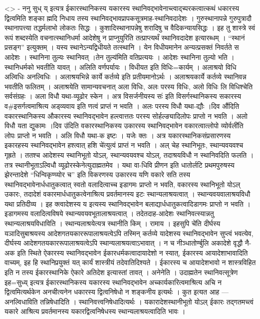 \textless{}\textgreater{} - ननु सुध् य् इत्यत्र ईकारस्थानिकस्य यकारस्य
स्थानिवद्भावेनाच्त्वाद्च्परकत्वात्कथं धकारस्य द्वित्वमिति शङ्का ह्मदि
निधाय तस्य स्थानिवद्भावप्रापकसूत्रमाह-स्थानिवदादेशः । गुरुस्थानापन्ने
गुरुपुत्रादौ स्थानापत्त्या तद्धर्मलाभो लोकतः सिद्धः ।
कुशादिस्थानापन्नेषु शरादिषु च वैदिकन्यायसिद्धः । इह तु शास्त्रे स्वं
रूपं शब्दस्येति वचनात्स्थानिधर्मा आदेशेषु न प्राप्नुयुरिति
तत्प्राप्त्यर्थं स्थानिवदादेश इत्यारब्धम् । ``स्थानं प्रसङ्ग''
इत्युक्तम् । यस्य स्थानेऽन्यद्विधीयते तत्स्थानि । येन विधीयमानेन
अन्यत्प्रसक्तं निवर्तते स आदेशः । स्थानिना तुल्यः स्थानिवत् ।तेन
तुल्य॑मिति वतिप्रत्ययः । आदेशः स्थानिना तुल्यो भति । स्थानिधर्मको भवतीति
यावत् । अलिति वर्णपर्यायः । विधीयत इति विधिः=कार्यम् । अलाश्रयो विधि
अल्विधिः अनल्विधिः । अलाश्रयभिन्ने कार्ये कर्तव्ये इति प्रतीयमानोऽर्थः ।
अलाश्रयकार्ये कर्तव्ये स्थानिवन्न भवतीति फलितम् । अलाश्रयेति
सामान्यवचनात् अला विधिः, अलः परस्य विधिः, अलो विधिः लि विधिश्चेति
सर्वसंग्रहः । अला विधौ यथा-व्यूढोर स्केन । अत्र विसर्जनीयस्य सः॑ इति
विसर्गस्थानिकस्य सकारस्य व\#इसर्गत्वमाश्रित्य अड्व्यवाय इति णत्वं
प्राप्तं न भवति । अलः परस्य विधौ यथा-द्यौः ।दिव औ॑दिति वकारस्थानिकस्य
औकारस्य स्थानिवद्भावेन हल्त्वात्ततः परस्य सोर्हल्ङ्यादिलोपः प्राप्तो न
भवति । अलो विधौ यता द्युकामः ।दिव उ॑दिति वकारस्थानिकस्य उकारस्य
स्थानिवद्भावेन वकारत्वात्लोपो व्योर्वली॑ति लोपः प्राप्तो न भवति । अलि
विधौ यथा-क इष्टः । यजेः क्तः । अत्र यकारस्थानिकसंप्रसारणस्य इकारहस्य
स्थानिवद्भावेन हश्त्वात् हशि चे॑त्युत्वं प्राप्तं न भवति । अल् चेह
स्थानिभूतः, स्थान्यवयवश्च गृह्रते । ततश्च आदेशस्य स्थानिभूतो योऽल्,
स्थान्यवयवश्च योऽल्, तदाश्रयविधौ न स्थानिवदिति फलति । तत्र
स्थानीभूताऽल्विधौ व्यूढोरस्केनेत्युदाह्मतमेव । यथा वा-धिवि प्रीणन इति
धातोर्लटि प्रथमपुरुषस्य झेरन्तादेशे ``धिन्विकृण्व्योर च'' इति विकरणस्य
उकारस्य यणि वकारे सति तस्य स्थानिवद्भावेनार्धधातुकत्वात् स्वतो
वलादित्वाच्च इडागमः प्राप्तो न भवति, वकारस्य स्थानिभूतो योऽल् उकारः,
तदादेशं वकारमार्धधातुकत्वेनाश्रित्य प्रवर्तमानस्य इटः
स्थान्यलाश्रयत्वात् । स्थान्यवयवालाश्रयविधौ यथा प्रतिदीव्य । इह
क्त्वादेशस्य य इत्यस्य स्थानिवद्भावेन बलाद्यार्धधातुकत्वादिडागमः
प्राप्तो न भवति । इडागमस्य वलादित्वविषये स्थान्यवयवभूतालाश्रयत्वात् ।
तदेतदाह-आदेशः स्थानिवत्स्यान्नतु स्थान्यलाश्रयविधाविति ।
स्थान्यलाश्रयेत्यत्र स्थानीति किम् । रामाय । इहसुपि चे॑ति दीर्घस्य
यञादिसुबाश्रयस्य आदेशगतयकाररूपालाश्रयत्वेऽपि तस्मिन् कर्तव्ये यादेशस्य
स्थानिवद्भावेन सुप्त्वं भवत्येव, दीर्घस्य आदेशगतयकाररूपालाश्रयत्वेऽपि
स्थान्यलाश्रयत्वाऽभावात् । न च नीञ्धातोर्ण्बुलि अकादेशे वृद्धौ नै-अक इति
स्थिते ऐकारस्य स्थानिवद्भावेन ईकारधर्मकत्वादायादेशो न स्यात्, ईकारस्य
आयादेशाभावादिति वाच्यम्, इह हि स्थानिप्रयुक्तं यत् कार्यं शास्त्रीयं
तदेवातिदिश्यते । ईकारस्य च आयादेशभावो न शास्त्रविहित इति न तस्य
ईकारस्थानिके ऐकारे अतिदेश इत्यास्तां तावत् । अनेनेति । उदाह्मतेन
स्थानिवत्सूत्रेण इह=सुध्य् इत्यत्र ईकारस्थानिकस्य यकारस्य स्थानिवद्भावेन
अच्कार्यकारित्वमाश्रित्य अचि न द्वित्वमित्यर्थकेन अनचीत्यनेन धकारस्य
द्वित्वनिषेधो न शङ्कनीय इत्यर्थः । कुत इत्यत आह --- अनल्विधाविति
तन्निषेधादिति । स्थानिवत्त्वनिषेधादित्यर्थः । यकारादेशस्थानीभूतो योऽल्
ईकारः तद्गतमच्त्वं यकारे आश्रित्य प्रवर्तमानस्य यकारद्वित्वनिषेधस्य
स्थान्यलाश्रयत्वादिति भावः ।

